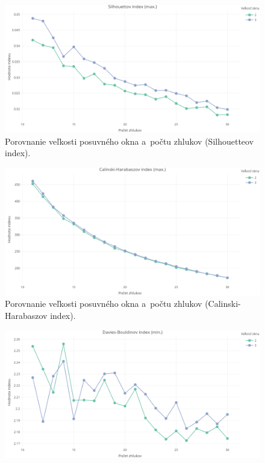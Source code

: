 \documentclass[a4paper,twoside,slovak,12pt,appendix]{article}
\begin{document}
\begin{appendices}
\begin{figure}[htbp]
  \centering
  \includegraphics[width=\textwidth]{cvi/dtw_basic_workdays_dense/201902271851-Sil-dtw_basic_workdays_dense.png}
  \caption{Porovnanie veľkosti posuvného okna a~počtu zhlukov (Silhouetteov index).}
\end{figure}
\begin{figure}[htbp]
  \centering
  \includegraphics[width=\textwidth]{cvi/dtw_basic_workdays_dense/201902271851-CH-dtw_basic_workdays_dense.png}
  \caption{Porovnanie veľkosti posuvného okna a~počtu zhlukov (Calinski-Harabaszov index).}
\end{figure}
\begin{figure}[htbp]
  \centering
  \includegraphics[width=\textwidth]{cvi/dtw_basic_workdays_dense/201902271851-DB-dtw_basic_workdays_dense.png}

\end{figure}
\end{appendices}
\end{document}
